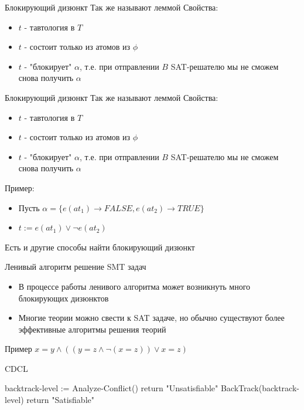 \documentclass{beamer}
\begin{document}
\begin{frame}{Блокирующий дизюнкт}
Так же называют леммой\newline
Свойства:
\begin{itemize}
\item $t$ - тавтология в $T$
\item $t$ - состоит только из атомов из $\phi$
\item $t$ - "блокирует" $\alpha$, т.е. при отправлении $B$ SAT-решателю мы не сможем снова получить $\alpha$
\end{itemize}
\end{frame}

\begin{frame}{Блокирующий дизюнкт}
Так же называют леммой\newline
Свойства:
\begin{itemize}
\item $t$ - тавтология в $T$
\item $t$ - состоит только из атомов из $\phi$
\item $t$ - "блокирует" $\alpha$, т.е. при отправлении $B$ SAT-решателю мы не сможем снова получить $\alpha$
\end{itemize}
Пример:
\begin{itemize}
\item Пусть $\alpha = \{e(at_1) \rightarrow FALSE, e(at_2) \rightarrow TRUE\}$
\item $t := e(at_1) \vee \lnot e(at_2)$
\end{itemize}
Есть и другие способы найти блокирующий дизюнкт
\end{frame}

\begin{frame}{Ленивый алгоритм решение SMT задач}
\begin{itemize}
\item В процессе работы ленивого алгоритма может возникнуть много блокирующих дизюнктов
\item Многие теории можно свести к SAT задаче, но обычно существуют более эффективные алгоритмы решения теорий
\end{itemize}
\end{frame}

\begin{frame}{Пример}
$x = y \wedge ((y = z \wedge \lnot(x = z)) \vee x = z)$
\end{frame}

\begin{frame}{CDCL}
\begin{algorithmic}
            \State backtrack-level := Analyze-Conflict()
                \State return "Unsatisfiable"
            \EndIf
            \State BackTrack(backtrack-level)
                \State return "Satisfiable"
            \EndIf
        \EndWhile
    \EndWhile
\EndFunction
\end{algorithmic}
\end{frame}
\end{document}
